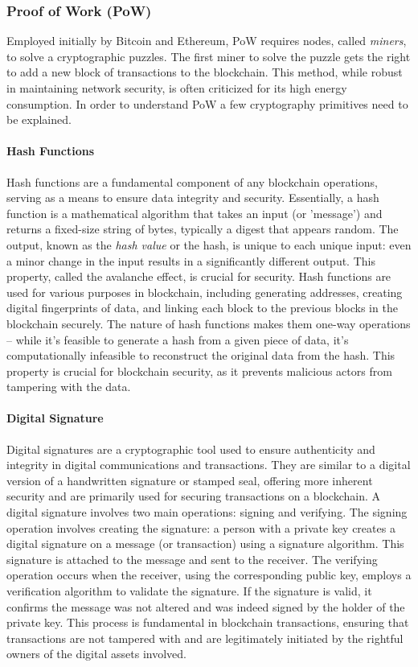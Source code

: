 \subsubsection{Proof of Work (PoW)} 
Employed initially by Bitcoin and Ethereum, PoW requires nodes, called \textit{miners}, to solve a cryptographic puzzles. The first miner to solve the puzzle gets the right to add a new block of transactions to the blockchain. This method, while robust in maintaining network security, is often criticized for its high energy consumption. In order to understand PoW a few cryptography primitives need to be explained.


\paragraph{Hash Functions}
Hash functions are a fundamental component of any blockchain operations, serving as a means to ensure data integrity and security. Essentially, a hash function is a mathematical algorithm that takes an input (or 'message') and returns a fixed-size string of bytes, typically a digest that appears random. The output, known as the \textit{hash value} or the hash, is unique to each unique input: even a minor change in the input results in a significantly different output. This property, called the avalanche effect, is crucial for security. Hash functions are used for various purposes in blockchain, including generating addresses, creating digital fingerprints of data, and linking each block to the previous blocks in the blockchain securely. The nature of hash functions makes them one-way operations – while it's feasible to generate a hash from a given piece of data, it's computationally infeasible to reconstruct the original data from the hash. This property is crucial for blockchain security, as it prevents malicious actors from tampering with the data.


\paragraph{Digital Signature}\label{digital_signature}
Digital signatures are a cryptographic tool used to ensure authenticity and integrity in digital communications and transactions. They are similar to a digital version of a handwritten signature or stamped seal, offering more inherent security and are primarily used for securing transactions on a blockchain. A digital signature involves two main operations: signing and verifying. The signing operation involves creating the signature: a person with a private key creates a digital signature on a message (or transaction) using a signature algorithm. This signature is attached to the message and sent to the receiver. The verifying operation occurs when the receiver, using the corresponding public key, employs a verification algorithm to validate the signature. If the signature is valid, it confirms the message was not altered and was indeed signed by the holder of the private key. This process is fundamental in blockchain transactions, ensuring that transactions are not tampered with and are legitimately initiated by the rightful owners of the digital assets involved.


